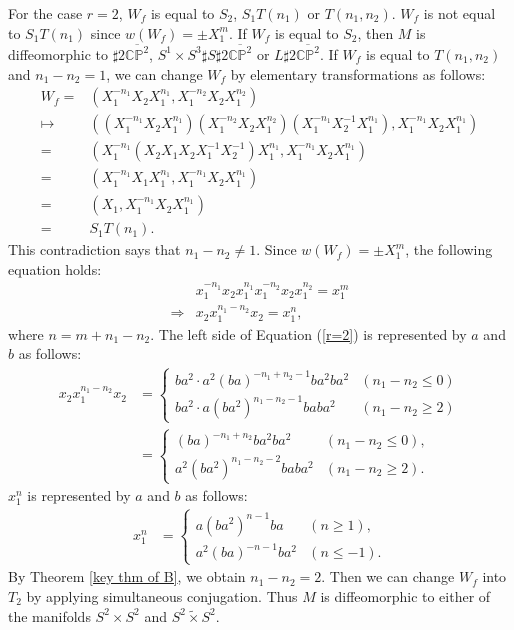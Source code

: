 \documentclass{amsart}
\theoremstyle{plain}
\theoremstyle{definition}
\begin{document}
For the case $r=2$, $W_f$ is equal to $S_2$, $S_1T(n_1)$ or $T(n_1,n_2)$. 
$W_f$ is not equal to $S_1T(n_1)$ since $w(W_f)=\pm X_1^m$. 
If $W_f$ is equal to $S_2$, then $M$ is diffeomorphic to $\sharp 2\overline{\mathbb{CP}^2}$, $S^1\times S^3\sharp S\sharp 2\overline{\mathbb{CP}^2}$ or $L\sharp 2\overline{\mathbb{CP}^2}$. 
If $W_f$ is equal to $T(n_1,n_2)$ and $n_1-n_2=1$, we can change $W_f$ by elementary transformations as follows: 
{\allowdisplaybreaks
\begin{align*}
W_f = & (X_1^{-n_1}X_2X_1^{n_1},X_1^{-n_2}X_2X_1^{n_2}) \\
\mapsto & ((X_1^{-n_1}X_2X_1^{n_1})(X_1^{-n_2}X_2X_1^{n_2})(X_1^{-n_1}X_2^{-1}X_1^{n_1}),X_1^{-n_1}X_2X_1^{n_1}) \\
= & (X_1^{-n_1}(X_2X_1X_2X_1^{-1}X_2^{-1})X_1^{n_1},X_1^{-n_1}X_2X_1^{n_1}) \\
= & (X_1^{-n_1}X_1X_1^{n_1},X_1^{-n_1}X_2X_1^{n_1}) \\
= & (X_1,X_1^{-n_1}X_2X_1^{n_1}) \\
= & S_1T(n_1). 
\end{align*}
}
This contradiction says that $n_1-n_2\neq 1$. 
Since $w(W_f)=\pm X_1^m$, the following equation holds: 
{\allowdisplaybreaks
\begin{align}
\label{r=2}
& x_1^{-n_1}x_2x_1^{n_1}x_1^{-n_2}x_2x_1^{n_2}=x_1^m \nonumber \\
\Rightarrow & x_2x_1^{n_1-n_2}x_2=x_1^n, 
\end{align}
}
where $n=m+n_1-n_2$. 
The left side of Equation (\ref{r=2}) is represented by $a$ and $b$ as follows: 
{\allowdisplaybreaks
\begin{align*}
x_2x_1^{n_1-n_2}x_2 & = \begin{cases}
ba^2\cdot a^2(ba)^{-n_1+n_2-1}ba^2ba^2 & (n_1-n_2\leq 0) \\
ba^2\cdot a(ba^2)^{n_1-n_2-1}baba^2 & (n_1-n_2\geq 2) 
\end{cases} \\
& = \begin{cases}
(ba)^{-n_1+n_2}ba^2ba^2 & (n_1-n_2\leq 0), \\
a^2(ba^2)^{n_1-n_2-2}baba^2 & (n_1-n_2\geq 2). 
\end{cases}
\end{align*}
}
$x_1^n$ is represented by $a$ and $b$ as follows: 
{\allowdisplaybreaks
\begin{align}
\label{x_1^n}
x_1^n & = \begin{cases}
a(ba^2)^{n-1}ba & (n\geq 1), \\
a^2(ba)^{-n-1}ba^2 & (n\leq -1). 
\end{cases}
\end{align}
}
By Theorem \ref{key thm of B}, we obtain $n_1-n_2=2$. 
Then we can change $W_f$ into $T_2$ by applying simultaneous conjugation. 
Thus $M$ is diffeomorphic to either of the manifolds $S^2\times S^2$ and $S^2\tilde{\times}S^2$. 
\end{document}

